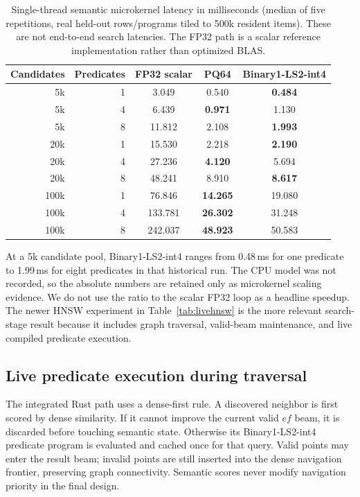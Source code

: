 \begin{table}[t]
\centering
\caption{Single-thread semantic microkernel latency in milliseconds (median of five repetitions, real held-out rows/programs tiled to 500k resident items). These are not end-to-end search latencies. The FP32 path is a scalar reference implementation rather than optimized BLAS.}
\label{tab:latency}
\small
\begin{tabular}{rrccc}
\toprule
Candidates & Predicates & FP32 scalar & PQ64 & Binary1-LS2-int4\\
\midrule
5k   & 1 & 3.049 & 0.540 & \textbf{0.484}\\
5k   & 4 & 6.439 & \textbf{0.971} & 1.130\\
5k   & 8 & 11.812 & 2.108 & \textbf{1.993}\\
20k  & 1 & 15.530 & 2.218 & \textbf{2.190}\\
20k  & 4 & 27.236 & \textbf{4.120} & 5.694\\
20k  & 8 & 48.241 & 8.910 & \textbf{8.617}\\
100k & 1 & 76.846 & \textbf{14.265} & 19.080\\
100k & 4 & 133.781 & \textbf{26.302} & 31.248\\
100k & 8 & 242.037 & \textbf{48.923} & 50.583\\
\bottomrule
\end{tabular}
\end{table}

At a 5k candidate pool, Binary1-LS2-int4 ranges from 0.48\,ms for one predicate to 1.99\,ms for eight predicates in that historical run. The CPU model was not recorded, so the absolute numbers are retained only as microkernel scaling evidence. We do not use the ratio to the scalar FP32 loop as a headline speedup. The newer HNSW experiment in Table~\ref{tab:livehnsw} is the more relevant search-stage result because it includes graph traversal, valid-beam maintenance, and live compiled predicate execution.

\subsection{Live predicate execution during traversal}
The integrated Rust path uses a dense-first rule. A discovered neighbor is first scored by dense similarity. If it cannot improve the current valid $ef$ beam, it is discarded before touching semantic state. Otherwise its Binary1-LS2-int4 predicate program is evaluated and cached once for that query. Valid points may enter the result beam; invalid points are still inserted into the dense navigation frontier, preserving graph connectivity. Semantic scores never modify navigation priority in the final design.

